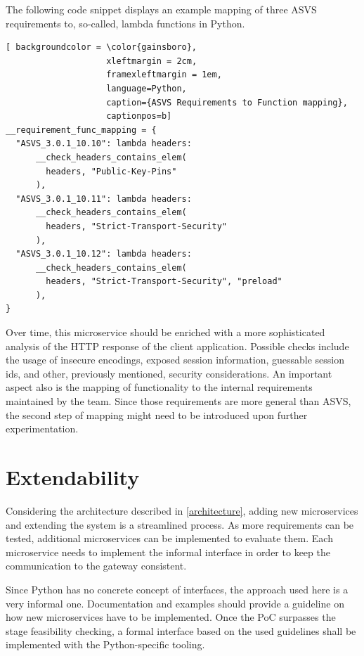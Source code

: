 The following code snippet displays an example mapping of three ASVS requirements to, so-called, lambda functions in Python.

\begin{lstlisting}[ backgroundcolor = \color{gainsboro}, 
                    xleftmargin = 2cm, 
                    framexleftmargin = 1em, 
                    language=Python,
                    caption={ASVS Requirements to Function mapping},
                    captionpos=b]
__requirement_func_mapping = {
  "ASVS_3.0.1_10.10": lambda headers: 
      __check_headers_contains_elem(
        headers, "Public-Key-Pins"
      ),
  "ASVS_3.0.1_10.11": lambda headers: 
      __check_headers_contains_elem(
        headers, "Strict-Transport-Security"
      ),
  "ASVS_3.0.1_10.12": lambda headers: 
      __check_headers_contains_elem(
        headers, "Strict-Transport-Security", "preload"
      ),
}
\end{lstlisting}

Over time, this microservice should be enriched with a more sophisticated analysis of the HTTP response of the client application. Possible checks include the usage of insecure encodings, exposed session information, guessable session ids, and other, previously mentioned, security considerations.
An important aspect also is the mapping of functionality to the internal requirements maintained by the team. Since those requirements are more general than ASVS, the second step of mapping might need to be introduced upon further experimentation.


\section{Extendability}
\label{extendability}
Considering the architecture described in \ref{architecture}, adding new microservices and extending the system is a streamlined process. As more requirements can be tested, additional microservices can be implemented to evaluate them. Each microservice needs to implement the informal interface in order to keep the communication to the gateway consistent.

Since Python has no concrete concept of interfaces, the approach used here is a very informal one. Documentation and examples should provide a guideline on how new microservices have to be implemented. Once the PoC surpasses the stage feasibility checking, a formal interface based on the used guidelines shall be implemented with the Python-specific tooling.

